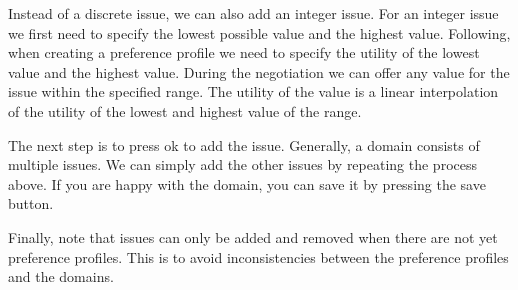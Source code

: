 \documentclass[]{article}
\begin{document}
Instead of a discrete issue, we can also add an integer issue. For an integer issue we first need to specify the lowest possible value and the highest value. Following, when creating a preference profile we need to specify the utility of the lowest value and the highest value. During the negotiation we can offer any value for the issue within the specified range. The utility of the value is a linear interpolation of the utility of the lowest and highest value of the range.

The next step is to press ok to add the issue. Generally, a domain consists of multiple issues. We can simply add the other issues by repeating the process above. If you are happy with the domain, you can save it by pressing the save button.

Finally, note that issues can only be added and removed when there are not yet preference profiles. This is to avoid inconsistencies between the preference profiles and the domains.
\end{document}
